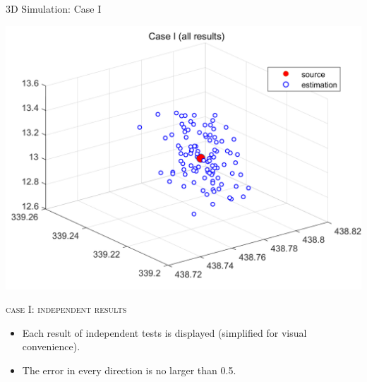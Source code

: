 \documentclass[10pt]{beamer}
\begin{document}
\begin{frame}{3D Simulation: Case I}
  \begin{center}
  \includegraphics[scale = 0.25]{img/case1result_all.png}
  \end{center}
  \begin{center} \textsc{case I: independent results} \end{center}
  \begin{itemize}
    \item \small Each result of independent tests is displayed (simplified for visual convenience).
    \item \small The error in every direction is no larger than 0.5.
  \end{itemize}
\end{frame}
\end{document}
